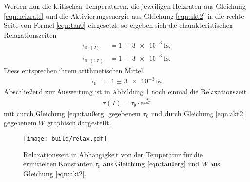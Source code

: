 Werden nun die kritischen Temperaturen, die jeweiligen Heizraten aus Gleichung \eqref{eqn:heizrate} und die
Aktivierungsenergie aus Gleichung \eqref{eqn:akt2} in die rechte Seite von Formel \eqref{eqn:tau0}
eingesetzt, so ergeben sich die charakteristischen Relaxationszeiten
\begin{align}
  \tau_{0,(2)} &= \SI{1(3)e-3}{\femto\second}, \\
  \tau_{0,(1.5)} &= \SI{1(3)e-3}{\femto\second}.
\end{align}
Diese entsprechen ihrem arithmetischen Mittel
\begin{align}
  \tau_0 &= \SI{1(3)e-3}{\femto\second}.
  \label{eqn:tau0erg}
\end{align}
Abschließend zur Auswertung ist in Abbildung \ref{fig:relaxationszeit} noch einmal die Relaxationszeit
\begin{align}
  \tau(T) = \tau_0 \cdot \mathrm{e}^{\frac{W}{k_\text{B} T}}
\end{align}
mit durch Gleichung \eqref{eqn:tau0erg} gegebenem $\tau_0$ und durch Gleichung \eqref{eqn:akt2} gegebenem
$W$ graphisch dargestellt.

\begin{figure}
  \centering
  \texttt{[image: build/relax.pdf]}
  \caption{Relaxationszeit in Abhängigkeit von der Temperatur für die ermittelten Konstanten $\tau_0$ aus
  Gleichung \eqref{eqn:tau0erg} und $W$ aus Gleichung \eqref{eqn:akt2}.}
  \label{fig:relaxationszeit}
\end{figure}
